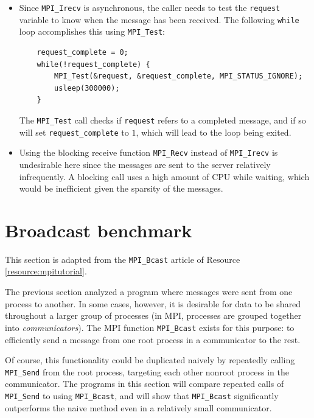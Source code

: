 \documentclass{article}
\begin{document}
\begin{itemize}
\begin{itemize}
    \item Since \texttt{MPI\_Irecv} is asynchronous, the caller needs to test the \texttt{request} variable to know when the message has been received. The following \texttt{while} loop accomplishes this using \texttt{MPI\_Test}:
\begin{verbatim}
    request_complete = 0;
    while(!request_complete) {
        MPI_Test(&request, &request_complete, MPI_STATUS_IGNORE);
        usleep(300000);
    }\end{verbatim}
    The \texttt{MPI\_Test} call checks if \texttt{request} refers to a completed message, and if so will set \texttt{request\_complete} to $1$, which will lead to the loop being exited.
    
    \item Using the blocking receive function \texttt{MPI\_Recv} instead of \texttt{MPI\_Irecv} is undesirable here since the messages are sent to the server relatively infrequently. A blocking call uses a high amount of CPU while waiting, which would be inefficient given the sparsity of the messages.
    \end{itemize}

\end{itemize}

\section{Broadcast benchmark}

This section is adapted from the \texttt{MPI\_Bcast} article of Resource \ref{resource:mpitutorial}.

The previous section analyzed a program where messages were sent from one process to another. In some cases, however, it is desirable for data to be shared throughout a larger group of processes (in MPI, processes are grouped together into \emph{communicators}).
The MPI function \texttt{MPI\_Bcast} exists for this purpose: to efficiently send a message from one root process in a communicator to the rest.

Of course, this functionality could be duplicated naively by repeatedly calling \texttt{MPI\_Send} from the root process, targeting each other nonroot process in the communicator. The programs in this section will compare repeated calls of \texttt{MPI\_Send} to using \texttt{MPI\_Bcast}, and will show that \texttt{MPI\_Bcast} significantly outperforms the naive method even in a relatively small communicator. 
\end{document}
